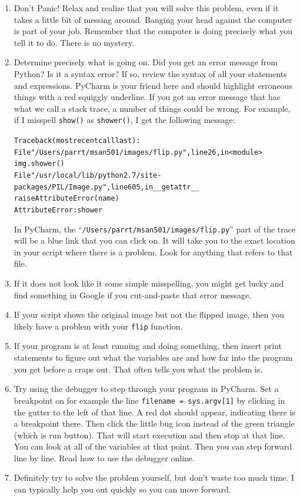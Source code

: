 \begin{enumerate}
\item Don't Panic! Relax and realize that you will solve this problem, even if it takes a little bit of messing around. Banging your head against the computer is part of your job. Remember that the computer is doing precisely what you tell it to do. There is no mystery.
\item  Determine precisely what is going on. Did you get an error message from Python?  Is it a syntax error? If so, review the syntax of all your statements and expressions. PyCharm is your friend here and should highlight erroneous things with a red squiggly underline. If you got an error message that has what we call a stack trace, a number of things could be wrong. For example, if I misspell {\tt show()} as {\tt shower()}, I get the following message:
\begin{alltt}\small
Traceback (most recent call last):
  File "/Users/parrt/msan501/images/flip.py", line 26, in <module>
    img.shower()
  File "/usr/local/lib/python2.7/site-packages/PIL/Image.py", line 605, in __getattr__
    raise AttributeError(name)
AttributeError: shower
\end{alltt}
In PyCharm, the ``{\tt /Users/parrt/msan501/images/flip.py}'' part of the trace will be a blue link that you can click on. It will take you to the exact location in your script where there is a problem. Look for anything that refers to that file.
\item If it does not look like it some simple misspelling, you might get lucky and find something in Google if you cut-and-paste that error message.
\item If your script shows the original image but not the flipped image, then you likely have a problem with your {\tt flip} function.
\item If your program is at least running and doing something, then insert print statements to figure out what the variables are and how far into the program you get before a craps out. That often tells you what the problem is.
\item Try using the debugger to step through your program in PyCharm. Set a breakpoint on for example the line {\tt filename = sys.argv[1]} by clicking in the gutter to the left of that line.  A red dot should appear, indicating there is a breakpoint there. Then click the little bug icon instead of the green triangle (which is run button). That will start execution and then stop at that line. You can look at all of the variables at that point. Then you can step forward line by line. Read how to use the debugger online.
\item  Definitely try to solve the problem yourself, but don't waste too much time. I can typically help you out quickly so you can move forward.
\end{enumerate}

